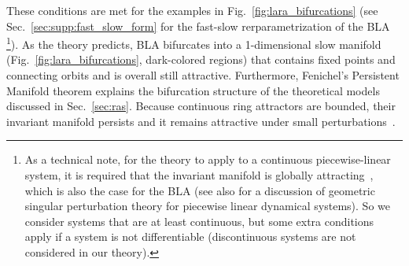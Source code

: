 \documentclass{article} %
\newcounter{ct}
\theoremstyle{definition}
\theoremstyle{remark}
\renewcommand{\cite}{\citep}
\begin{document}
These conditions are met for the examples in Fig.~\ref{fig:lara_bifurcations} (see Sec.~\ref{sec:supp:fast_slow_form} for the fast-slow rerparametrization of the BLA
\footnote{As a technical note, for the theory to apply to a continuous piecewise-linear system, it is required that the invariant manifold is globally attracting~\cite{simpson2018}, which is also the case for the BLA (see also \citep{prohens2013canard,prohens2016slow} for a discussion of geometric singular perturbation theory for piecewise linear dynamical systems). So we consider systems that are at least continuous, but some extra conditions apply if a system is not differentiable (discontinuous systems are not considered in our theory).}).
As the theory predicts, BLA bifurcates into a 1-dimensional slow manifold (Fig.~\ref{fig:lara_bifurcations}, dark-colored regions) that contains fixed points and connecting orbits and is overall still attractive.
Furthermore, Fenichel's Persistent Manifold theorem explains the bifurcation structure of the theoretical models discussed in Sec.~\ref{sec:ras}.
Because continuous ring attractors are bounded, their invariant manifold persists and it remains attractive under small perturbations~\citep{wiggins1994}.
\end{document}
